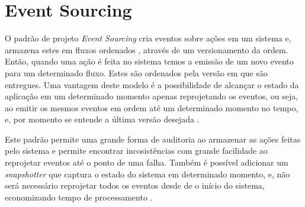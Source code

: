 \section{Event Sourcing}

O padrão de projeto \textit{Event Sourcing} cria eventos sobre ações em um
sistema e, armazena estes em fluxos ordenados \cite{event-sourcing},
através de um versionamento da ordem. Então, quando uma ação é feita no sistema
temos a emissão de um novo evento para um determinado fluxo. Estes são ordenados
pela versão em que são entregues. Uma vantagem deste modelo é a possibilidade
de alcançar o estado da aplicação em um determinado momento apenas reprojetando
os eventos, ou seja, ao emitir os mesmos eventos em ordem até um determinado
momento no tempo, e, por momento se entende a última versão desejada
\cite{event-sourcing}.

Este padrão permite uma grande forma de auditoria ao armazenar as ações
feitas pelo sistema e permite encontrar incosistências com grande facilidade
ao reprojetar eventos até o ponto de uma falha. Também é possível adicionar
um \textit{snapshotter} que captura o estado do sistema em determinado
momento, e, não será necessário reprojetar todos os eventos desde de o início
do sistema, economizando tempo de processamento \cite{event-sourcing}.
